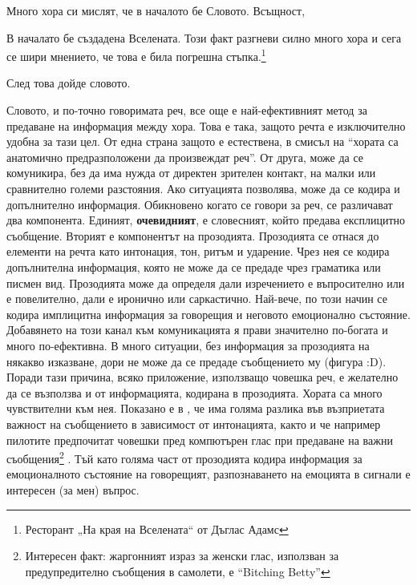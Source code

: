 \documentclass[main.tex]{subfiles}
\begin{document}

Много хора си мислят, че в началото бе Словото. Всъщност, 
\begin{displayquote}
    В началато бе създадена Вселената. Този факт разгневи силно много хора и сега се шири мнението, че това е била погрешна стъпка.\footnote{Ресторант „На края на Вселената“ от Дъглас Адамс}
\end{displayquote}
    
След това дойде словото.

Словото, и по-точно говоримата реч, все още е най-ефективният метод за предаване на информация между хора. Това е така, защото речта е изключително удобна за тази цел. От една страна защото е естествена, в смисъл на ``хората са анатомично предразположени да произвеждат реч''. От друга, може да се комуникира, без да има нужда от директен зрителен контакт, на малки или сравнително големи разстояния. Ако ситуацията позволява, може да се кодира и допълнително информация. Обикновено когато се говори за реч, се различават два компонента. Единият, \textbf{очевидният}, е словесният, който предава експлицитно съобщение. Вторият е компонентът на прозодията. Прозодията се отнася до елементи на речта като интонация, тон, ритъм и ударение. Чрез нея се кодира допълнителна информация, която не може да се предаде чрез граматика или писмен вид. Прозодията може да определя дали изречението е въпросително или е повелително, дали е иронично или саркастично. Най-вече, по този начин се кодира имплицитна информация за говорещия и неговото емоционално състояние. Добавянето на този канал към комуникацията я прави значително по-богата и много по-ефективна. В много ситуации, без информация за прозодията на някакво изказване, дори не може да се предаде съобщението му (фигура :D). Поради тази причина, всяко приложение, използващо човешка реч, е желателно да се възползва и от информацията, кодирана в прозодията. Хората са много чувствителни към нея. Показано е в \cite{urgency}, че има голяма разлика във възприетата важност на съобщението в зависимост от интонацията, както и че например пилотите предпочитат човешки пред компютърен глас при предаване на важни съобщения\footnote{Интересен факт: жаргонният израз за женски глас, използван за предупредително съобщения в самолети, е ``Bitching Betty''} \cite{cockpit}. Тъй като голяма част от прозодията кодира информация за емоционалното състояние на говорещият, разпознаването на емоцията в сигнали е интересен (за мен) въпрос.
\end{document}
